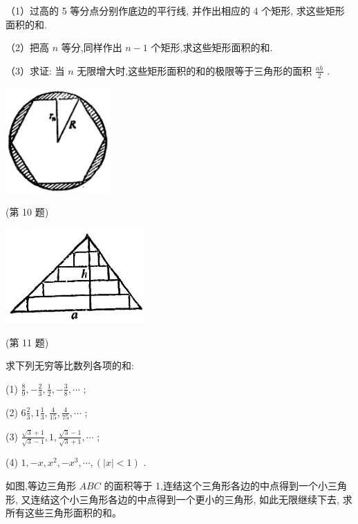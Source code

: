 \documentclass[lang=cn,newtx,10pt,scheme=chinese]{elegantbook}
\begin{document}
\begin{problemset}[习题一]
	（1）过高的 5 等分点分别作底边的平行线, 并作出相应的 4 个矩形, 求这些矩形面积的和.
	
	（2）把高 \(n\) 等分,同样作出 \(n - 1\) 个矩形,求这些矩形面积的和.
	
	（3）求证: 当 \(n\) 无限增大时,这些矩形面积的和的极限等于三角形的面积 \(\frac{ah}{2}\) .
	
	\begin{center}
		\includegraphics[max width=0.3\textwidth]{images/01912c18-5c3f-733d-b775-749ba9897a9d_20_155049.jpg}
	\end{center}
	
	(第 10 题)
	
	\begin{center}
		\includegraphics[max width=0.4\textwidth]{images/01912c18-5c3f-733d-b775-749ba9897a9d_20_862371.jpg}
	\end{center}
	
	(第 11 题)
	
	\item 求下列无穷等比数列各项的和:
	
	(1) \(\frac{8}{9}, - \frac{2}{3},\frac{1}{2}, - \frac{3}{8},\cdots\) ;
	
	(2) \(6\frac{2}{3},1\frac{1}{3},\frac{4}{15},\frac{4}{75},\cdots\) ;
	
	(3) \(\frac{\sqrt{3} + 1}{\sqrt{3} - 1},1,\frac{\sqrt{3} - 1}{\sqrt{3} + 1},\cdots\) ;
	
	(4) \(1, - x,{x}^{2}, - {x}^{3},\cdots ,\left( {\left| x\right| < 1}\right)\) .
	
	\item 如图,等边三角形 \({ABC}\) 的面积等于 1,连结这个三角形各边的中点得到一个小三角形, 又连结这个小三角形各边的中点得到一个更小的三角形, 如此无限继续下去, 求所有这些三角形面积的和。
	

\end{problemset}
\end{document}

